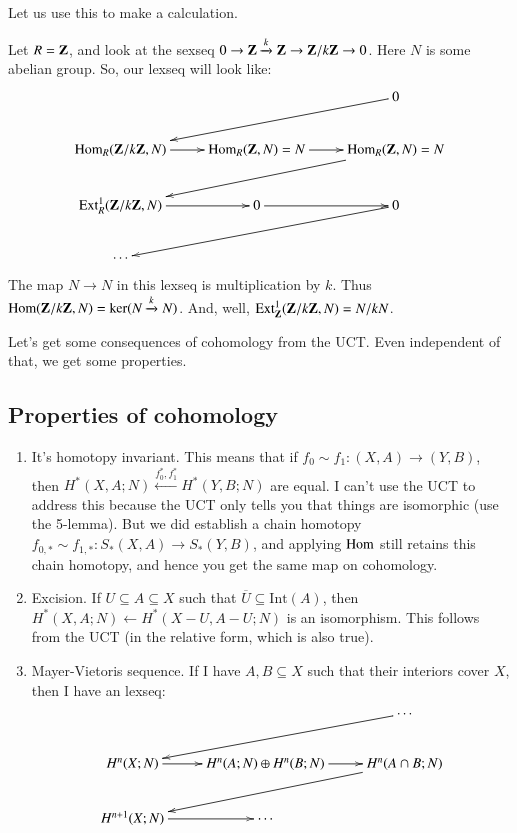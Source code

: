 Let us use this to make a calculation.
\begin{example}
Let $R=\mathbf Z$, and look at the sexseq $0\to \mathbf Z\xrightarrow{k}\mathbf Z\to\mathbf Z/k\mathbf Z\to 0$. Here $N$ is some abelian group. So, our lexseq will look like:
\begin{equation*}
\xymatrix{ & & 0\ar[dll]\\
\Hom_R(\Z/k\Z,N)\ar[r] & \Hom_R(\Z,N)=N\ar[r] & \Hom_R(\Z,N)=N\ar[dll]\\
\Ext^1_R(\Z/k\Z,N)\ar[r] & 0\ar[r] & 0\ar[dll]\\
\cdots & &}
\end{equation*}
The map $N\to N$ in this lexseq is multiplication by $k$. Thus $\operatorname{Hom}(\mathbf Z/k\mathbf Z,N)=\ker(N\xrightarrow{k}N)$. And, well, $\operatorname{Ext}^1_\mathbf Z(\mathbf Z/k\mathbf Z,N)=N/kN$.
\end{example}
Let's get some consequences of cohomology from the UCT. Even independent of that, we get some properties.
\subsection{Properties of cohomology}
\begin{enumerate}
\item It's homotopy invariant. This means that if $f_0\sim f_1:(X,A)\to (Y,B)$, then $ H^\ast(X,A;N)\xleftarrow{f_0^\ast,f_1^\ast} H^\ast(Y,B;N)$ are equal. I can't use the UCT to address this because the UCT only tells you that things are isomorphic (use the 5-lemma). But we did establish a chain homotopy $f_{0,\ast}\sim f_{1,\ast}:S_\ast(X,A)\to S_\ast(Y,B)$, and applying $\operatorname{Hom}$ still retains this chain homotopy, and hence you get the same map on cohomology.
\item Excision. If $U\subseteq A\subseteq X$ such that $\overline{U}\subseteq\mathrm{Int}(A)$, then $ H^\ast(X,A;N)\leftarrow H^\ast(X-U,A-U;N)$ is an isomorphism. This follows from the UCT (in the relative form, which is also true).
\item Mayer-Vietoris sequence. If I have $A,B\subseteq X$ such that their interiors cover $X$, then I have an lexseq:
\begin{equation*}
\xymatrix{ & & \cdots\ar[dll]\\
 H^n(X;N)\ar[r] & H^n(A;N)\oplus H^n(B;N)\ar[r] & H^n(A\cap B;N)\ar[dll]\\
 H^{n+1}(X;N)\ar[r] & \cdots & }
\end{equation*}
\end{enumerate}
